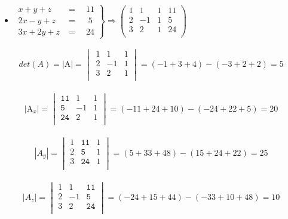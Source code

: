 \documentclass[12pt, twocolumn, landscape, a4paper]{article}
\begin{document}
\begin{itemize}
\item{ %
$\left .
\begin{array}{rc}
x + y + z &= \quad 11 \\
2x - y + z &= \quad\;5 \\ 
3x + 2y + z &= \quad 24
\end{array} \right \} \Rightarrow \left (
\begin{array}{ccc|r}
1 & 1 & 1 & 11\\
2 & -1 & 1 & 5 \\ 
3 & 2 & 1 & 24 \\
\end{array} \right )
$
}
\end{itemize}

\begin{eqnarray*}
det(A) = |\mathrm{A}| = 
\begin{vmatrix}
\,1 & 1 & 1 \\
\,2 & -1 & 1 \\ 
\,3 & 2 & 1 \\
\end{vmatrix} = (-1 + 3 + 4) - (-3 + 2 + 2) = 5
\end{eqnarray*}

\begin{eqnarray*}
|\mathrm{A}_{x}| = 
\begin{vmatrix}
\mathtt{11} & 1 & 1 \\
\mathtt{5} & -1 & 1 \\ 
\mathtt{24} & 2 & 1 \\
\end{vmatrix} = (-11 + 24 + 10) - (-24 + 22 + 5) = 20
\end{eqnarray*}

\begin{eqnarray*}
|A_{y}| = 
\begin{vmatrix}
1 & \mathtt{11} & 1 \\
2 & \mathtt{5}  & 1 \\ 
3 & \mathtt{24} & 1 \\
\end{vmatrix} = (5 + 33 + 48) - (15 + 24 + 22) = 25
\end{eqnarray*}

\begin{eqnarray*}
|A_{z}| = 
\begin{vmatrix}
1 & 1 & \mathtt{11} \\
2 & -1 & \mathtt{5} \\ 
3 & 2 & \mathtt{24} \\
\end{vmatrix} = (-24 + 15 + 44) - (-33 + 10 + 48) = 10
\end{eqnarray*}
\end{document}
